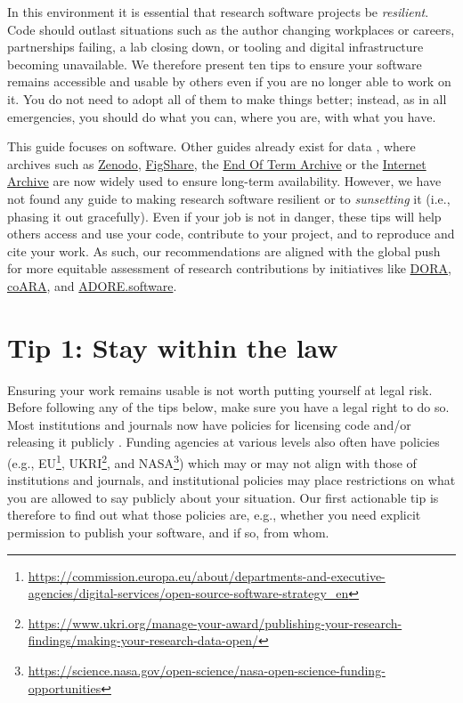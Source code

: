 \documentclass[10pt,letterpaper]{article}
\begin{document}
In this environment it is essential that research software projects be \emph{resilient}.
Code should outlast situations such as the author changing workplaces or careers,
partnerships failing,
a lab closing down,
or tooling and digital infrastructure becoming unavailable.
We therefore present ten tips to ensure your software remains accessible and usable by others
even if you are no longer able to work on it.
You do not need to adopt all of them to make things better;
instead,
as in all emergencies,
you should do what you can,
where you are,
with what you have.

This guide focuses on software.
Other guides already exist for data \cite{Perkel2023},
where archives such as \href{https://zenodo.org/}{Zenodo},
\href{https://figshare.com/}{FigShare},
the \href{https://eotarchive.org/}{End Of Term Archive}
or the \href{http://archive.org/}{Internet Archive}
are now widely used to ensure long-term availability.
However,
we have not found any guide to making research software resilient
or to \emph{sunsetting} it (i.e., phasing it out gracefully).
Even if your job is not in danger,
these tips will help others access and use your code,
contribute to your project,
and to reproduce and cite your work.
As such,
our recommendations
are aligned with the global push for more equitable assessment of research contributions
by initiatives like \href{https://sfdora.org/}{DORA},
\href{https://coara.eu/}{coARA},
and \href{https://adore.software/}{ADORE.software}.

\section*{Tip 1: Stay within the law}

Ensuring your work remains usable is not worth putting yourself at legal risk.
Before following any of the tips below,
make sure you have a legal right to do so.
Most institutions and journals now have policies for licensing code and/or releasing it publicly \cite{Katz2018,Ham2019}.
Funding agencies at various levels also often have policies
(e.g.,
EU\footnote{\url{https://commission.europa.eu/about/departments-and-executive-agencies/digital-services/open-source-software-strategy_en}}, UKRI\footnote{\url{https://www.ukri.org/manage-your-award/publishing-your-research-findings/making-your-research-data-open/}}, 
and NASA\footnote{\url{https://science.nasa.gov/open-science/nasa-open-science-funding-opportunities}})
which may or may not align with those of institutions and journals,
and institutional policies may place restrictions on what you are allowed to say publicly about your situation.
Our first actionable tip is therefore to find out what those policies are,
e.g.,
whether you need explicit permission to publish your software,
and if so,
from whom.
\end{document}
